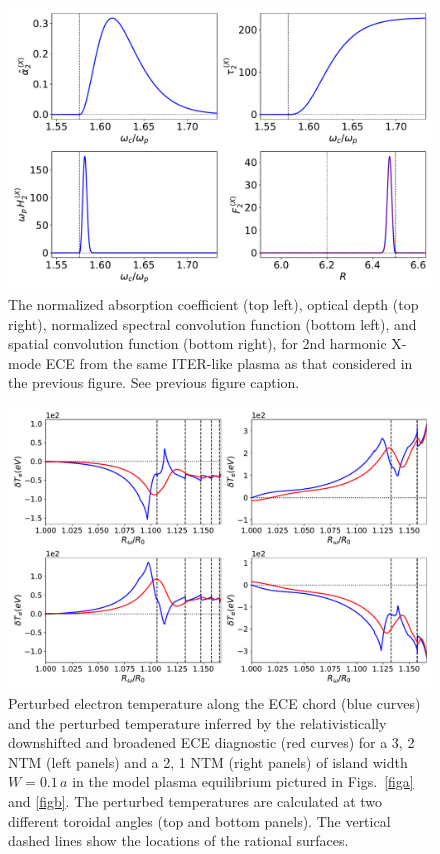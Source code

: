 \documentclass[12pt,prb,aps]{revtex4-1}
\begin{document}
\begin{figure}
\centerline{\includegraphics[width=\textwidth]{X.pdf}}
\caption{The normalized  absorption coefficient (top left), optical depth (top right), normalized
spectral convolution function (bottom left), and spatial convolution function (bottom right), for 2nd  harmonic X-mode ECE from the same 
ITER-like plasma as that considered in the previous figure. See previous figure caption.
\label{Xmode}}
\end{figure}


\iffalse
\begin{figure}
\centerline{\includegraphics[width=\textwidth]{Fig15.pdf}}
\caption{Perturbed electron temperature along the ECE chord (blue curves) and the perturbed temperature inferred by the relativistically downshifted and  broadened ECE diagnostic (red curves) for a
3, 2 NTM (left panels) and a 2, 1 NTM (right panels) of island width $W=0.1\,a$ in the model plasma equilibrium pictured in Figs.~\ref{figa} and \ref{figb}.
The perturbed temperatures are calculated  at two different toroidal angles (top and bottom panels). 
The vertical dashed lines show the locations of the rational surfaces. 
\label{fig13}}
\end{figure}
\end{document}

